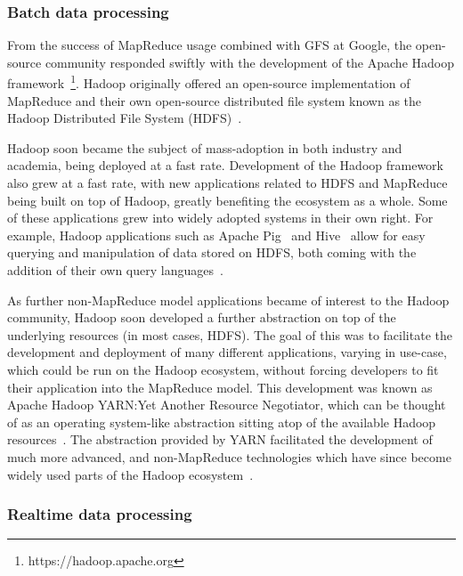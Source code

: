 
\subsubsection{Batch data processing} %
\label{sub:apache hadoop}

From the success of MapReduce usage combined with GFS at Google, the open-source community responded swiftly with the
development of the Apache Hadoop framework~\footnote{https://hadoop.apache.org}. Hadoop originally offered an open-source
implementation of MapReduce and their own open-source distributed file system known as the Hadoop Distributed File System
(HDFS)~\cite{shvachko_hadoop_2010}.

Hadoop soon became the subject of mass-adoption in both industry and academia, being deployed at a fast rate.
Development of the Hadoop framework also grew at a fast rate, with new applications related to HDFS and MapReduce being
built on top of Hadoop, greatly benefiting the ecosystem as a whole. Some of these applications grew into widely adopted
systems in their own right. For example, Hadoop applications such as Apache Pig~\cite{gates_building_2009} and
Hive~\cite{thusoo_hive_2010} allow for easy querying and manipulation of data stored on HDFS, both coming with the
addition of their own query languages~\cite{olston_pig_2008}.

As further non-MapReduce model applications became of interest to the Hadoop community, Hadoop soon
developed a further abstraction on top of the underlying resources (in most cases, HDFS). The goal of this was to
facilitate the development and deployment of many different applications, varying in use-case, which could be run on the
Hadoop ecosystem, without forcing developers to fit their application into the MapReduce model. This development was
known as Apache Hadoop YARN:\@ Yet Another Resource Negotiator, which can be thought of as an operating system-like abstraction sitting
atop of the available Hadoop resources~\cite{vavilapalli_apache_2013}. The abstraction provided by YARN facilitated the
development of much more advanced, and non-MapReduce technologies which have since become widely used parts of the
Hadoop ecosystem~\cite{harrison_hadoops_2012}.


\subsubsection{Realtime data processing} %
\label{sub:prop_realtime_data_processing}

